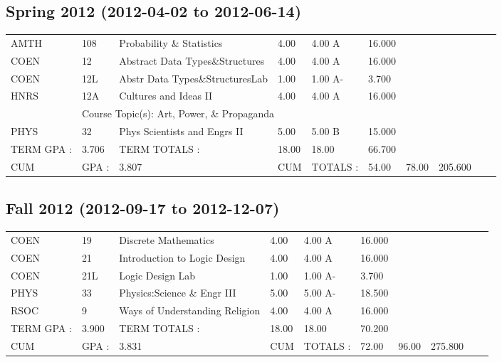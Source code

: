 \documentclass{scrartcl}\usepackage[T1]{fontenc}
\begin{document}
\subsection{Spring 2012	(2012-04-02 to 2012-06-14)}
\begin{tabular}{ l  l  l  l  l  l  l  l  l  l }
AMTH&108&Probability \& Statistics&4.00&4.00 A&16.000& & & & \\
COEN&12&Abstract Data Types\&Structures&4.00&4.00 A&16.000& & & & \\
COEN&12L&Abstr Data Types\&StructuresLab&1.00&1.00 A-&3.700& & & & \\
HNRS&12A&Cultures and Ideas II&4.00&4.00 A&16.000& & & & \\
\multicolumn{1}{l}{ }
&
\multicolumn{9}{l}{Course Topic(s): Art, Power, \& Propaganda}
\\
PHYS&32&Phys Scientists and Engrs II&5.00&5.00 B&15.000& & & & \\
\hline
TERM GPA :&3.706&TERM TOTALS :&18.00&18.00&66.700& & & & \\
CUM&GPA :&3.807&CUM&TOTALS :&54.00&78.00&205.600& & \\\end{tabular}
\subsection{Fall 2012	(2012-09-17 to 2012-12-07)}
\begin{tabular}{ l  l  l  l  l  l  l  l  l  l }
COEN&19&Discrete Mathematics&4.00&4.00 A&16.000& & & & \\
COEN&21&Introduction to Logic Design&4.00&4.00 A&16.000& & & & \\
COEN&21L&Logic Design Lab&1.00&1.00 A-&3.700& & & & \\
PHYS&33&Physics:Science \& Engr III&5.00&5.00 A-&18.500& & & & \\
RSOC&9&Ways of Understanding Religion&4.00&4.00 A&16.000& & & & \\
\hline
TERM GPA :&3.900&TERM TOTALS :&18.00&18.00&70.200& & & & \\
CUM&GPA :&3.831&CUM&TOTALS :&72.00&96.00&275.800& & \\\end{tabular}
\end{document}
